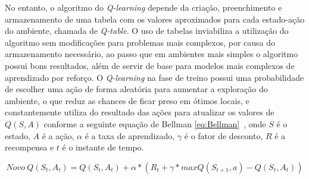 No entanto, o algoritmo do \emph{Q-learning} depende da criação, preenchimento e armazenamento de uma tabela com os valores aproximados para cada estado-ação do ambiente, chamada de \emph{Q-table}. O uso de tabelas inviabiliza a utilização do algoritmo sem modificações para problemas mais complexos, por causa do armazenamento necessário, ao passo que em ambientes mais simples o algoritmo possui bons resultados, além de servir de base para modelos mais complexos de aprendizado por reforço. O \emph{Q-learning} na fase de treino possui uma probabilidade de escolher uma ação de forma aleatória para aumentar a exploração do ambiente, o que reduz as chances de ficar preso em ótimos locais, e constantemente utiliza do resultado das ações para atualizar os valores de $Q(S, A)$ conforme a seguinte equação de Bellman \ref{eq:Bellman}~\citep{Bellman_1954}, onde $S$ é o estado, $A$ é a ação, $\alpha$ é a taxa de aprendizado, $\gamma$ é o fator de desconto, $R$ é a recompensa e $t$ é o instante de tempo.

\begin{equation}
	\label{eq:Bellman}
	Novo \ Q(S_{t}, A_{t}) = Q(S_{t}, A_{t}) + \alpha * (R_{t} + \gamma * maxQ(S_{t+1}, a) - Q(S_{t}, A_{t}))
\end{equation}
